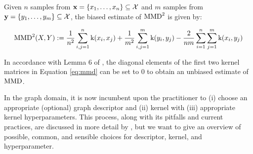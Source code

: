 Given $n$ samples from $\mathbf{x}=\{x_1,\dots, x_n\}\subseteq\mathcal{X}$ and $m$
samples from $\mathbf{y}=\{y_1,\dots, y_m\}\subseteq\mathcal{X}$, the biased estimate
of $\text{MMD}^2$ is given by:

\begin{equation}
  \label{eq:mmd}
  \text{MMD}^2(X,Y) := {1\over n^2}\sum_{i,j=1}^n\text{k}(x_i, x_j) + {1\over m^2}\sum_{i,j=1}^m\text{k}(y_i,y_j) - {2\over nm}\sum_{i=1}^{n}\sum_{j=1}^{m}\text{k} (x_i,y_j)
\end{equation}

In accordance with Lemma 6 of \cite{gretton2012kernel}, the diagonal elements of
the first two kernel matrices in Equation \ref{eq:mmd} can be set to $0$ to
obtain an unbiased estimate of $\text{MMD}$.

In the graph domain, it is now incumbent upon the practitioner to (i) choose an
appropriate (optional) graph descriptor and (ii) kernel with (iii) appropriate
kernel hyperparameters. This process, along with its pitfalls and current
practices, are discussed in more detail by \cite{o2021evaluation}, but we want
to give an overview of possible, common, and sensible choices for descriptor,
kernel, and hyperparameter.

